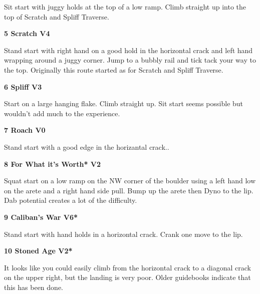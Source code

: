 \begin{multicols}{2}
\begin{adjustwidth}{0.5cm}{}
							\begin{adjustwidth}{0.5cm}{}				
							Sit start with juggy holds at the top of a low ramp. Climb straight up into the top of Scratch and Spliff Traverse.
							\end{adjustwidth}
						\end{adjustwidth}
					\label{rt:Scratch}
\colorbox{RoyalBlue!20}{
\parbox{0.95\linewidth}{
\textbf{
5 Scratch V4  
}
}
}

					\begin{adjustwidth}{0.5cm}{}				
					Stand start with right hand on a good hold in the horizontal crack and left hand wrapping around a juggy corner. Jump to a bubbly rail and tick tack your way to the top. Originally this route started as for Scratch and Spliff Traverse.
					\end{adjustwidth}

					\label{rt:Spliff}
\colorbox{green!20}{
\parbox{0.95\linewidth}{
\textbf{
6 Spliff V3  \warn
}
}
}

					\begin{adjustwidth}{0.5cm}{}				
					Start on a large hanging flake. Climb straight up. Sit start seems possible but wouldn't add much to the experience.
					\end{adjustwidth}
					\label{rt:Roach}
\colorbox{green!20}{
\parbox{0.95\linewidth}{
\textbf{
7 Roach V0  
}
}
}

					\begin{adjustwidth}{0.5cm}{}				
					Stand start with a good edge in the horizantal crack..
					\end{adjustwidth}
					\label{rt:For What it's Worth}
\colorbox{green!20}{
\parbox{0.95\linewidth}{
\textbf{
8 For What it's Worth* V2  
}
}
}

					\begin{adjustwidth}{0.5cm}{}				
					Squat start on a low ramp on the NW corner of the boulder using a left hand low on the arete and a right hand side pull. Bump up the arete then Dyno to the lip. Dab potential creates a lot of the difficulty.
					\end{adjustwidth}

					\label{rt:Caliban's War}
\colorbox{RoyalBlue!20}{
\parbox{0.95\linewidth}{
\textbf{
9 Caliban's War V6*  
}
}
}

					\begin{adjustwidth}{0.5cm}{}				
					Stand start with hand holds in a horizontal crack. Crank one move to the lip.
					\end{adjustwidth}
					\label{rt:Stoned Age}
\colorbox{green!20}{
\parbox{0.95\linewidth}{
\textbf{
10 Stoned Age V2*  
}
}
}

					\begin{adjustwidth}{0.5cm}{}				
					It looks like you could easily climb from the horizontal crack to a diagonal crack on the upper right, but the landing is very poor. Older guidebooks indicate that this has been done.
					\end{adjustwidth}
\end{multicols}
\clearpage